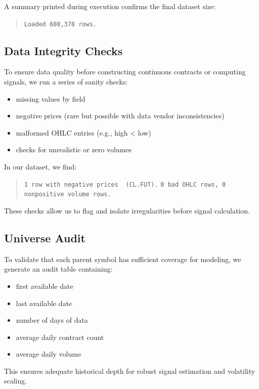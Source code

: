 \documentclass{article}
\begin{document}
A summary printed during execution confirms the final dataset size:

\begin{quote}
\texttt{Loaded 608,378 rows.}
\end{quote}

\subsection{Data Integrity Checks}

To ensure data quality before constructing continuous contracts or computing signals, we run a series of
sanity checks:

\begin{itemize}
    \item missing values by field
    \item negative prices (rare but possible with data vendor inconsistencies)
    \item malformed OHLC entries (e.g., high < low)
    \item checks for unrealistic or zero volumes
\end{itemize}

In our dataset, we find:

\begin{quote}
\texttt{1 row with negative prices \,(CL.FUT).}  
\texttt{0 bad OHLC rows, 0 nonpositive volume rows.}
\end{quote}

These checks allow us to flag and isolate irregularities before signal calculation.

\subsection{Universe Audit}

To validate that each parent symbol has sufficient coverage for modeling, we generate an audit table
containing:

\begin{itemize}
    \item first available date
    \item last available date
    \item number of days of data
    \item average daily contract count
    \item average daily volume
\end{itemize}

This ensures adequate historical depth for robust signal estimation and volatility scaling.
\end{document}
